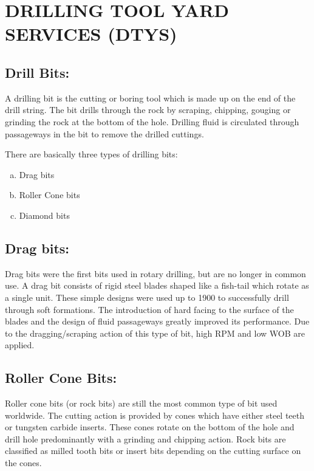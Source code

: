 \chapter{DRILLING TOOL YARD SERVICES (DTYS)}

\section*{\textbf{Drill Bits:} }
A drilling bit is the cutting or boring tool which is made
up on the end of the drill string. The bit drills through the rock by
scraping, chipping, gouging or grinding the rock at the bottom of the
hole. Drilling fluid is circulated through passageways in the bit to
remove the drilled cuttings.


There are basically three types of drilling bits:

\begin{enumerate}[(a)]
\item Drag bits
\item Roller Cone bits
\item Diamond bits

\end{enumerate}

\section*{Drag bits:} 

Drag bits were the first bits used in rotary drilling, but are
no longer in common use. A drag bit consists of rigid steel blades
shaped like a fish-tail which rotate as a single unit. These simple
designs were used up to 1900 to successfully drill through soft
formations. The introduction of hard facing to the surface of the
blades and the design of fluid passageways greatly improved its
performance. Due to the dragging/scraping action of this type of bit,
high RPM and low WOB are applied.


\section*{\textbf{Roller Cone Bits:}}

Roller cone bits (or rock bits) are still the most
common type of bit used worldwide. The cutting action is provided
by cones which have either steel teeth or tungsten carbide inserts.
These cones rotate on the bottom of the hole and drill hole
predominantly with a grinding and chipping action.
Rock bits are classified as milled tooth bits or insert bits depending
on the cutting surface on the cones.

